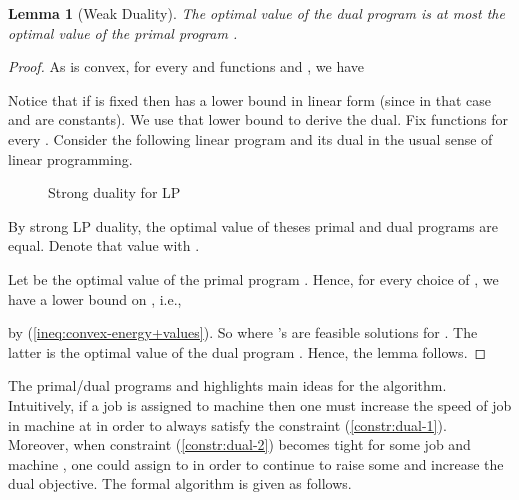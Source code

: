 \documentclass[11pt,a4paper]{article}
\newtheorem{lemma}{Lemma}
\begin{document}
\begin{lemma}[Weak Duality] 	\label{lem:formulation-PD}
The optimal value of the dual program  is at most the optimal value of the primal program
.
\end{lemma}
\begin{proof}
As  is convex, for every  and functions  and , we have


Notice that if  is fixed then  has a lower bound in linear form
(since in that case   and  are constants).
We use that lower bound to derive the dual.  
Fix functions  for every . 
Consider the following linear program and its dual
in the usual sense of linear programming.


\begin{figure}[ht]	
\caption{Strong duality for LP}
\label{fig:weak-duality}
\end{figure}
By strong LP duality, the optimal value of theses primal and dual programs are equal. Denote that value with .  

Let  be the optimal value of the primal program .
Hence, for every choice of , we have a lower bound on , i.e., 
 
by (\ref{ineq:convex-energy+values}). 
So 
where 's are feasible solutions for . 
The latter is the optimal value of the dual program . Hence, 
the lemma follows.  
\end{proof}

The primal/dual programs  and  
highlights main ideas for the algorithm. 
Intuitively, if a job  is assigned to machine  then
one must increase the speed of job  in machine  at 
 in order to always 
satisfy the constraint (\ref{constr:dual-1}). 
Moreover, when constraint (\ref{constr:dual-2}) becomes tight for some job 
and machine , one could assign  to  in order to continue to raise some 
and increase the dual objective. The formal algorithm is given as follows.
\end{document}
